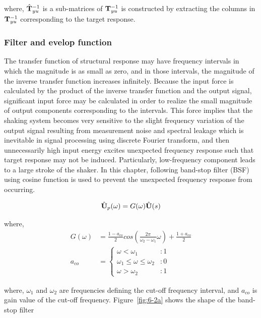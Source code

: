 where, $\hat{\mathbf{T}}_{yu}^{-1}$ is a sub-matrices of $\mathbf{T}_{yu}^{-1}$ is constructed by extracting the columns in $\mathbf{T}_{yu}^{-1}$ corresponding to the target response.

\subsubsection{Filter and evelop function}
The transfer function of structural response may have frequency intervals in which the magnitude is as small as zero, and in those intervals, the magnitude of the inverse transfer function increases infinitely. Because the input force is calculated by the product of the inverse transfer function and the output signal, significant input force may be calculated in order to realize the small magnitude of output components corresponding to the intervals. This force implies that the shaking system becomes very sensitive to the slight frequency variation of the output signal resulting from measurement noise and spectral leakage which is inevitable in signal processing using discrete Fourier transform, and then unnecessarily high input energy excites unexpected frequency response such that target response may not be induced. Particularly, low-frequency component leads to a large stroke of the shaker. In this chapter, following band-stop filter (BSF) using cosine function is used to prevent the unexpected frequency response from occurring.

\begin{equation}\label{eq:6-5}
\hat{\mathbf{U}}_{p}(\omega) = G(\omega)\hat{\mathbf{U}}(s)
\end{equation}

where,
\begin{align}
G(\omega) &= \frac{1-a_{co}}{2}cos \left( \frac{2\pi}{\omega_{2}-\omega_{1}}\omega \right) + \frac{1+a_{co}}{2}\label{eq:6-6}\\
a_{co} &=\left\{\begin{array}{lr} \omega < \omega_{1} &: 1 \\ \omega_{1} \leq \omega \leq \omega_{2} &: 0 \\ \omega > \omega_{2} &: 1\end{array} \right.
\label{eq:6-7}
\end{align}

where, $\omega_{1}$ and $\omega_{2}$ are frequencies defining the cut-off frequency interval, and $a_{co}$ is gain value of the cut-off frequency. Figure~\ref{fig:6-2a} shows the shape of the band-stop filter

